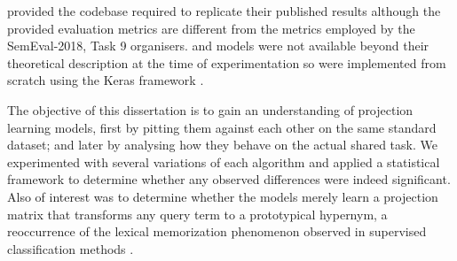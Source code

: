 \citeauthor{ustalov2017negative} provided the codebase required to replicate their published results although the provided evaluation metrics are different from the metrics employed by the SemEval-2018, Task 9 organisers.  \citep{yamane2016distributional} and \citep{bernier2018crim} models were not available beyond their theoretical description at the time of experimentation so were implemented from scratch using the Keras framework \citep{chollet2015keras}.

The objective of this dissertation is to gain an understanding of projection learning models, first by pitting them against each other on the same standard dataset; and later by analysing how they behave on the actual shared task.  We experimented with several variations of each algorithm and applied a statistical framework to determine whether any observed differences were indeed significant.  Also of interest was to determine whether the models merely learn a projection matrix that transforms any query term to a prototypical hypernym, a reoccurrence of the lexical memorization phenomenon observed in supervised classification methods \citep{levy2015supervised}.
